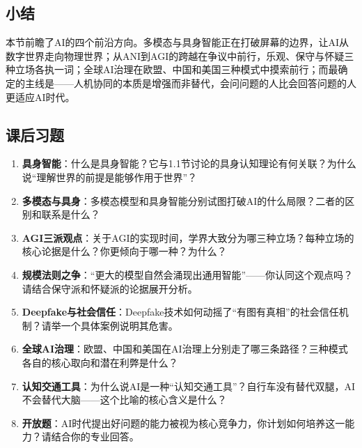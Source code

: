 \bigskip
\subsection*{小结}

本节前瞻了AI的四个前沿方向。多模态与具身智能正在打破屏幕的边界，让AI从数字世界走向物理世界；从ANI到AGI的跨越在争议中前行，乐观、保守与怀疑三种立场各执一词；全球AI治理在欧盟、中国和美国三种模式中摸索前行；而最确定的主线是——人机协同的本质是增强而非替代，会问问题的人比会回答问题的人更适应AI时代。

\bigskip
\subsection*{课后习题}
\begin{enumerate}
\setlength{\itemsep}{6pt}

\item \textbf{具身智能}：什么是具身智能？它与1.1节讨论的具身认知理论有何关联？为什么说``理解世界的前提是能够作用于世界''？

\item \textbf{多模态与具身}：多模态模型和具身智能分别试图打破AI的什么局限？二者的区别和联系是什么？

\item \textbf{AGI三派观点}：关于AGI的实现时间，学界大致分为哪三种立场？每种立场的核心论据是什么？你更倾向于哪一种？为什么？

\item \textbf{规模法则之争}：``更大的模型自然会涌现出通用智能''——你认同这个观点吗？请结合保守派和怀疑派的论据展开分析。

\item \textbf{Deepfake与社会信任}：Deepfake技术如何动摇了``有图有真相''的社会信任机制？请举一个具体案例说明其危害。

\item \textbf{全球AI治理}：欧盟、中国和美国在AI治理上分别走了哪三条路径？三种模式各自的核心取向和潜在利弊是什么？

\item \textbf{认知交通工具}：为什么说AI是一种``认知交通工具''？自行车没有替代双腿，AI不会替代大脑——这个比喻的核心含义是什么？

\item \textbf{开放题}：AI时代提出好问题的能力被视为核心竞争力，你计划如何培养这一能力？请结合你的专业回答。

\end{enumerate}

\vspace{16pt}

